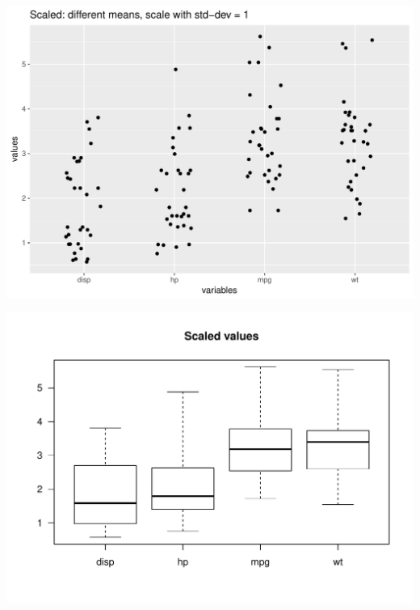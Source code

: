 \documentclass[12pt]{beamer}\usepackage[]{graphicx}\usepackage[]{color}
\makeatletter
\def\maxwidth{ %
  \ifdim\Gin@nat@width>\linewidth
    \linewidth
  \else
    \Gin@nat@width
  \fi
}
\newenvironment{knitrout}{}{} %
\makeatother
\begin{document}

\begin{frame}[fragile]



\begin{knitrout}\footnotesize
{}\color{fgcolor}

{\centering \includegraphics[width=\maxwidth]{figure/unnamed-chunk-11-1} 

}



\end{knitrout}

\end{frame}


\begin{frame}[fragile]

\begin{knitrout}\footnotesize
{}\color{fgcolor}

{\centering \includegraphics[width=\maxwidth]{figure/unnamed-chunk-12-1} 

}



\end{knitrout}

\end{frame}
\end{document}
